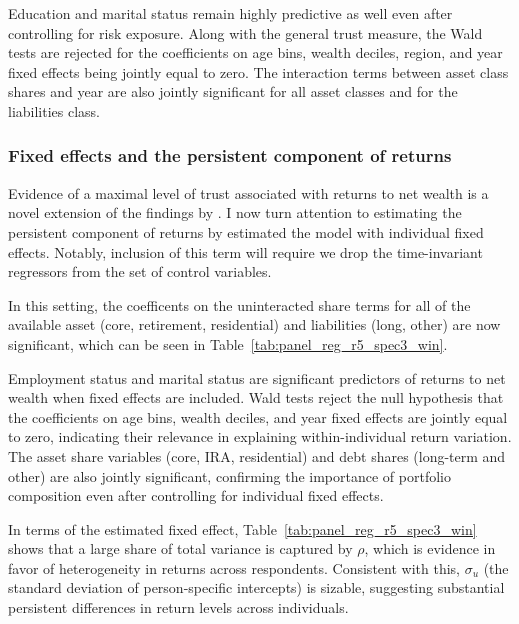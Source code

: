 \par Education and marital status remain highly predictive as well even after controlling for risk exposure. Along with the general trust measure, the Wald tests are rejected for the coefficients on age bins, wealth deciles, region, and year fixed effects being jointly equal to zero. The interaction terms between asset class shares and year are also jointly significant for all asset classes and for the  liabilities class.

\subsubsection{Fixed effects and the persistent component of returns}

\par Evidence of a maximal level of trust associated with returns to net wealth is a novel extension of the findings by \cite{jbpglg2016}. I now turn attention to estimating the persistent component of returns by estimated the model with individual fixed effects. Notably, inclusion of this term will require we drop the time-invariant regressors from the set of control variables. 

\par In this setting, the coefficents on the uninteracted share terms for all of the available asset (core, retirement, residential) and liabilities (long, other) are now significant, which can be seen in Table~\ref{tab:panel_reg_r5_spec3_win}.

\label{tab:panel_reg_r5_spec3_win}
\FloatBarrier

\par Employment status and marital status are significant predictors of returns to net wealth when fixed effects are included. Wald tests reject the null hypothesis that the coefficients on age bins, wealth deciles, and year fixed effects are jointly equal to zero, indicating their relevance in explaining within-individual return variation. The asset share variables (core, IRA, residential) and debt shares (long-term and other) are also jointly significant, confirming the importance of portfolio composition even after controlling for individual fixed effects.

\par In terms of the estimated fixed effect, Table~\ref{tab:panel_reg_r5_spec3_win} shows that a large share of total variance is captured by $\rho$, which is evidence in favor of heterogeneity in returns across respondents. Consistent with this, $\sigma_u$ (the standard deviation of person-specific intercepts) is sizable, suggesting substantial persistent differences in return levels across individuals.

